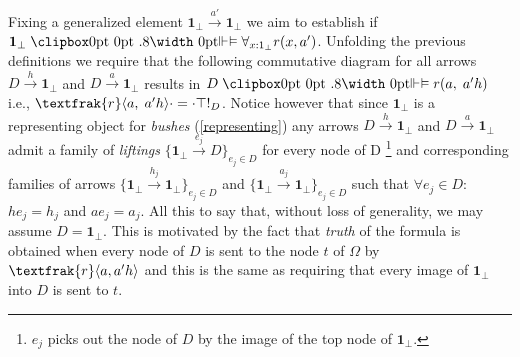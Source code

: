 \begin{ex}
	Fixing a generalized element $\textbf{1}_\bot \xrightarrow{a'} \textbf{1}_\bot$ we aim to establish if $\textbf{1}_\bot \VDashA \forall_{x:1_\bot} r(x,a')$.
\newline
	Unfolding the previous definitions we require that the following commutative diagram for all arrows $D \xrightarrow{h} \textbf{1}_\bot$ and $D \xrightarrow{a} \textbf{1}_\bot$ results in $D \VDashA r(a, \; a'h)$ i.e.,  $\textfrak{r}\langle a, \;a'h \rangle \cdot = \cdot \top!_D$. 
	\newline
	Notice however that since $\textbf{1}_\bot$ is a representing object for \emph{bushes} (\ref{representing}) any arrows $D \xrightarrow{h} \textbf{1}_\bot$ and $D \xrightarrow{a} \textbf{1}_\bot$ admit a family of \emph{liftings} $\{\textbf{1}_\bot \xrightarrow{e_j} D\}_{e_j \in D}$ for every node of D \footnote{$e_j$ picks out the node of $D$ by the image of the top node of $\textbf{1}_\bot$.}  and corresponding families of arrows $\{\textbf{1}_\bot \xrightarrow{h_j} \textbf{1}_\bot\}_{e_j \in D}$ and $\{\textbf{1}_\bot \xrightarrow{a_j} \textbf{1}_\bot\}_{e_j \in D}$ such that $\forall e_j \in D :$ $h e_j = h_j$ and $a e_j = a_j$. 
	\newline
	All this to say that, without loss of generality, we may assume $D=\textbf{1}_\bot$. This is motivated by the fact that \emph{truth} of the formula is obtained when every node of $D$ is sent to the node $t$ of $\Omega$ by $\textfrak{r}\langle a,a'h \rangle$ and this is the same as requiring that every image of $\textbf{1}_\bot$ into $D$ is sent to $t$.
	\begin{figure}[h]
		\centering
	\end{figure}

\end{ex}
